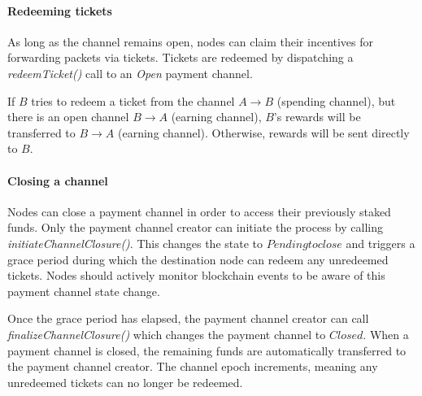 \paragraph{Redeeming tickets}
As long as the channel remains open, nodes can claim their incentives for forwarding packets via tickets. Tickets are redeemed by dispatching a \textit{redeemTicket()} call to an \textit{Open} payment channel.

If $B$ tries to redeem a ticket from the channel $A\rightarrow B$ (spending channel), but there is an open channel $B\rightarrow A$ (earning channel), $B$'s rewards will be transferred to $B\rightarrow A$ (earning channel). Otherwise, rewards will be sent directly to $B$.

\paragraph{Closing a channel}
Nodes can close a payment channel in order to access their previously staked funds. Only the payment channel creator can initiate the process by calling \textit{initiateChannelClosure()}. This changes the state to $Pending to close$ and triggers a grace period during which the destination node can redeem any unredeemed tickets. Nodes should actively monitor blockchain events to be aware of this payment channel state change.

Once the grace period has elapsed, the payment channel creator can call \textit{finalizeChannelClosure()} which changes the payment channel to $Closed$. When a payment channel is closed, the remaining funds are automatically transferred to the payment channel creator. The channel epoch increments, meaning any unredeemed tickets can no longer be redeemed.

